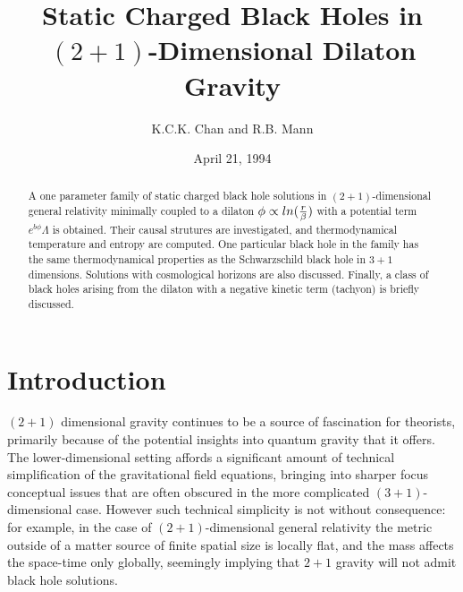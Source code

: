 \documentclass[12pt]{article}
\begin{document}
\title{Static Charged Black Holes in $(2+1)$-Dimensional Dilaton Gravity}
\author{K.C.K. Chan and R.B. Mann}
\date{April 21, 1994}
\maketitle


\begin{abstract}
    A one parameter family of static charged black hole solutions in
    $(2+1)$-dimensional general relativity minimally coupled to a dilaton
    $\phi\propto ln({r\over\beta})$ with a potential
    term $e^{b\phi}\Lambda$ is obtained.
    Their causal strutures are investigated, and
    thermodynamical temperature and entropy are computed. One
    particular black hole in the family has the same thermodynamical
    properties as the Schwarzschild black hole in $3+1$ dimensions.
    Solutions with cosmological horizons are also discussed. Finally,
    a class of black holes arising from the dilaton with
    a negative kinetic term (tachyon) is briefly discussed.
    
\end{abstract}

\section{Introduction}

$(2+1)$ dimensional gravity continues to be a source of fascination
for theorists, primarily because of the potential insights
into quantum gravity that it offers. The lower-dimensional setting affords
a significant amount of technical simplification of the gravitational field
equations, bringing into sharper focus conceptual issues that are often
obscured in the more complicated $(3+1)$-dimensional case. However such
technical simplicity is not without consequence: for example, in the case
of $(2+1)$-dimensional general relativity the metric outside of a matter
source of finite spatial size is locally flat, and the mass affects the
space-time only globally, seemingly implying that $2+1$ gravity will not
admit black hole solutions.
\end{document}
